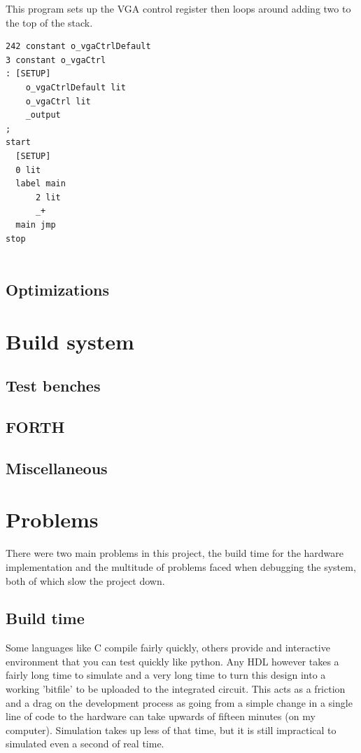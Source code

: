\documentclass	[a4paper, 10pt]	{article}
\begin{document}
      This program sets up the VGA control register then loops around adding two to the top
      of the stack.

\begin{verbatim}
242 constant o_vgaCtrlDefault 
3 constant o_vgaCtrl
: [SETUP]
    o_vgaCtrlDefault lit
    o_vgaCtrl lit 
    _output
;
start
  [SETUP]
  0 lit
  label main
      2 lit
      _+
  main jmp
stop 


\end{verbatim}



    \subsection{Optimizations}
  \section{Build system}
    \subsection{Test benches}
    \subsection{FORTH}
    \subsection{Miscellaneous}

  \section{Problems}

    There were two main problems in this project, the build time for the hardware
    implementation and the multitude of problems faced when debugging the system,
    both of which slow the project down.

    \subsection{Build time}

    Some languages like C compile fairly quickly, others provide and interactive
    environment that you can test quickly like python. Any HDL however takes
    a fairly long time to simulate and a very long time to turn this design into
    a working 'bitfile' to be uploaded to the integrated circuit. This acts as
    a friction and a drag on the development process as going from a simple change
    in a single line of code to the hardware can take upwards of fifteen minutes
    (on my computer). Simulation takes up less of that time, but it is still
    impractical to simulated even a second of real time. 
\end{document}
